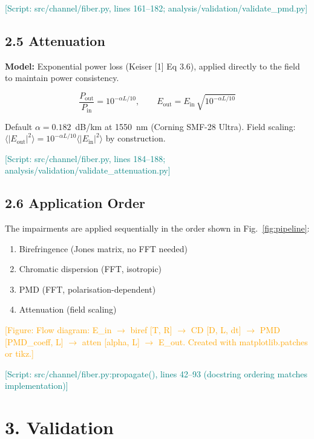 \documentclass[11pt,a4paper]{article}
\newcommand{\scriptref}[1]{\textcolor{teal}{[Script: #1]}}
\newcommand{\figref}[1]{\textcolor{orange}{[Figure: #1]}}
\begin{document}
\scriptref{src/channel/fiber.py, lines 161--182;
  analysis/validation/validate\_pmd.py}

\subsection{2.5 Attenuation}
\label{sec:atten}

\textbf{Model:} Exponential power loss (Keiser [1] Eq 3.6), applied
directly to the field to maintain power consistency.

\begin{equation}
  \frac{P_{\text{out}}}{P_{\text{in}}}
    = 10^{-\alpha L/10},
  \qquad
  E_{\text{out}} = E_{\text{in}}\,
    \sqrt{10^{-\alpha L/10}}
\end{equation}

Default $\alpha = 0.182$~dB/km at 1550~nm (Corning SMF-28 Ultra).
Field scaling: $\langle|E_{\text{out}}|^2\rangle = 10^{-\alpha L/10}
\langle|E_{\text{in}}|^2\rangle$ by construction.

\scriptref{src/channel/fiber.py, lines 184--188;
  analysis/validation/validate\_attenuation.py}

\subsection{2.6 Application Order}
\label{sec:order}

The impairments are applied sequentially in the order shown in
Fig.~\ref{fig:pipeline}:
\begin{enumerate}[nosep]
  \item Birefringence (Jones matrix, no FFT needed)
  \item Chromatic dispersion (FFT, isotropic)
  \item PMD (FFT, polarisation-dependent)
  \item Attenuation (field scaling)
\end{enumerate}

\figref{Flow diagram: E\_in $\rightarrow$ biref [T, R] $\rightarrow$
  CD [D, L, dt] $\rightarrow$ PMD [PMD\_coeff, L] $\rightarrow$
  atten [alpha, L] $\rightarrow$ E\_out.  Created with
  matplotlib.patches or tikz.}

\scriptref{src/channel/fiber.py:propagate(), lines 42--93 (docstring
  ordering matches implementation)}

\section{3. Validation}
\label{sec:validation}
\end{document}
